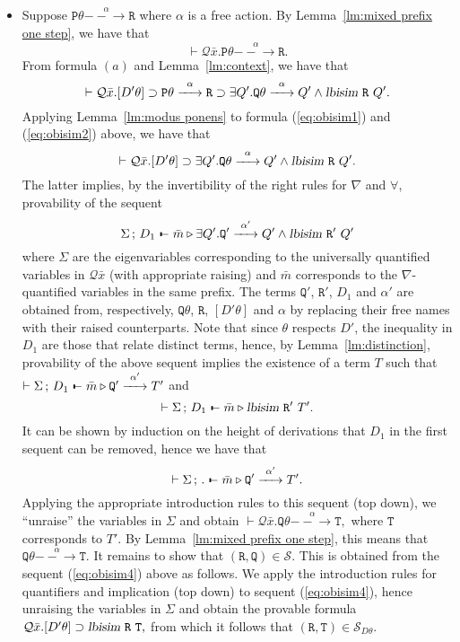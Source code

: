 \documentclass{acmtrans2m}
\def\Qscr{{\mathcal Q}}
\def\Sscr{{\mathcal S}}
\def\Ppi{{\mathtt P}}
\def\Qpi{{\mathtt Q}}
\def\Rpi{{\mathtt R}}
\def\Tpi{{\mathtt T}}
\def\relbar{\mathrel{\smash-}}
\def\joinrelm{\mathrel{\mkern-3.2mu}}
\def\tailpiece{\kern 1pt\vrule height 1ex width 0.3ex depth -.25ex}
\def\seqsym{\mathrel{\tailpiece\joinrelm\relbar}}
\newcommand{\Judg}[2]{#1\triangleright#2}
\newcommand{\NSeq}[3]{#1\,;\,#2 \seqsym #3}
\newcommand{\lbisim}[2]{\hbox{\sl lbisim}~#1~#2}
\newcommand{\oimp}{\supset}
\newcommand{\one  }[3]{#1\stackrel{#2}{-\!\!-\!\!\!\rightarrow    } #3}
\begin{document}
\begin{itemize}
\item Suppose $\one{\Ppi\theta}{\alpha}{\Rpi}$ where $\alpha$ is a free action. 
By Lemma~\ref{lm:mixed prefix one step}, we have that 
\begin{equation}
\label{eq:obisim1}
\vdash \Qscr \bar x. \one{\Ppi\theta}{\alpha}{\Rpi}.
\end{equation}
From formula $(a)$ and Lemma~\ref{lm:context}, we have that
\begin{equation}
\label{eq:obisim2}
\vdash \Qscr \bar x. [D'\theta] \oimp \one{\Ppi\theta}{\alpha}{\Rpi} 
\oimp \exists Q'. \one{\Qpi\theta}{\alpha}{Q'} \land \lbisim {\Rpi} {Q'}.
\end{equation}
Applying Lemma~\ref{lm:modus ponens} to formula (\ref{eq:obisim1}) and (\ref{eq:obisim2}) above,
we have that 
$$
\vdash \Qscr \bar x. [D'\theta] \oimp \exists Q'. \one{\Qpi\theta}{\alpha}{Q'} \land \lbisim {\Rpi} {Q'}.
$$
The latter implies, by the invertibility of the right rules for $\nabla$ and $\forall$,
provability of the sequent
$$
\NSeq{\Sigma}{D_1}{\Judg{\bar m}{\exists Q'. \one{\Qpi'}{\alpha'}{Q'} \land \lbisim {\Rpi'} {Q'}}}
$$
where $\Sigma$ are the eigenvariables corresponding to the universally quantified variables in $\Qscr \bar x$
(with appropriate raising) and $\bar m$ corresponds to the $\nabla$-quantified variables
in the same prefix. The terms $\Qpi'$, $\Rpi'$, $D_1$ and $\alpha'$ are obtained from, respectively,  
$\Qpi\theta$, $\Rpi$, $[D'\theta]$ and $\alpha$ by replacing their free names with their raised counterparts.
Note that since $\theta$ respects $D'$, the inequality in $D_1$ are those that relate
distinct terms, hence, by Lemma~\ref{lm:distinction}, provability of the above sequent implies
the existence of a term $T$ such that 
$\vdash \NSeq{\Sigma}{D_1}{\Judg{\bar m}{\one{\Qpi'}{\alpha'}{T'}}}$
and
\begin{equation}
\label{eq:obisim4}
\vdash \NSeq{\Sigma}{D_1}{\Judg{\bar m}{\lbisim {\Rpi'} {T'}}}.
\end{equation}
It can be shown by induction on the height of derivations that $D_1$ in the first sequent can
be removed, hence we have that
$$
\vdash \NSeq{\Sigma}{.}{\Judg{\bar m}{\one{\Qpi'}{\alpha'}{T'}}}.
$$
Applying the appropriate introduction rules to this sequent (top down), we 
``unraise'' the variables in $\Sigma$ and obtain 
$
\vdash \Qscr \bar x. \one{\Qpi\theta}{\alpha}{\Tpi}, 
$
where $\Tpi$ corresponds to $T'.$ By Lemma~\ref{lm:mixed prefix one step}, this means that 
$\one{\Qpi\theta}{\alpha}{\Tpi}.$
It remains to show that $(\Rpi,\Qpi) \in \Sscr.$ This is obtained from the sequent
(\ref{eq:obisim4}) above as follows. 
We apply the introduction rules for quantifiers and implication (top down) to sequent (\ref{eq:obisim4}), 
hence unraising the variables in $\Sigma$ and obtain the provable formula
$
\Qscr \bar x. [D'\theta] \oimp \lbisim {\Rpi}{\Tpi},
$
from which it follows that $(\Rpi, \Tpi) \in \Sscr_{D\theta }.$


\end{itemize}
\end{document}
